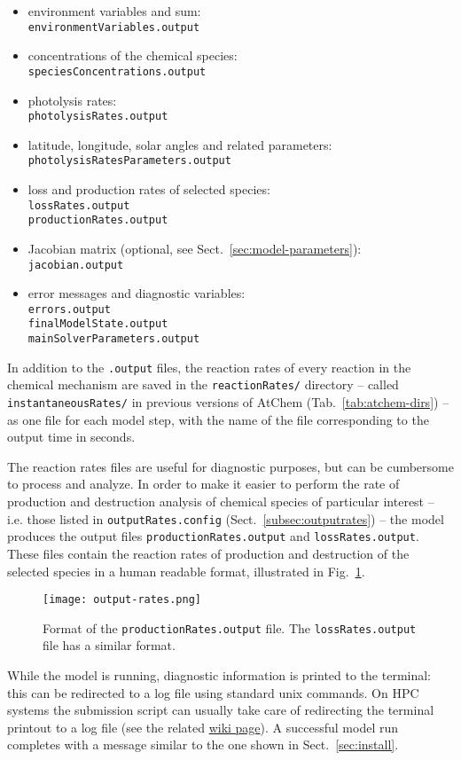 \begin{itemize}
\item environment variables and  sum:\\
  \texttt{environmentVariables.output}
\item concentrations of the chemical species:\\
  \texttt{speciesConcentrations.output}
\item photolysis rates:\\
  \texttt{photolysisRates.output}
\item latitude, longitude, solar angles and related parameters:\\
  \texttt{photolysisRatesParameters.output}
\item loss and production rates of selected species:\\
  \texttt{lossRates.output}\\
  \texttt{productionRates.output}
\item Jacobian matrix (optional, see Sect.~\ref{sec:model-parameters}):\\
  \texttt{jacobian.output}
\item error messages and diagnostic variables:\\
  \texttt{errors.output}\\
  \texttt{finalModelState.output}\\
  \texttt{mainSolverParameters.output}
\end{itemize}

In addition to the \texttt{.output} files, the reaction rates of every
reaction in the chemical mechanism are saved in the
\texttt{reactionRates/} directory -- called
\texttt{instantaneousRates/} in previous versions of AtChem
(Tab.~\ref{tab:atchem-dirs}) -- as one file for each model step, with
the name of the file corresponding to the output time in seconds.

The reaction rates files are useful for diagnostic purposes, but can
be cumbersome to process and analyze. In order to make it easier to
perform the rate of production and destruction analysis of chemical
species of particular interest -- i.e. those listed in
\texttt{outputRates.config} (Sect.~\ref{subsec:outputrates}) -- the
model produces the output files \texttt{productionRates.output} and
\texttt{lossRates.output}. These files contain the reaction rates of
production and destruction of the selected species in a human readable
format, illustrated in Fig.~\ref{fig:ropa}.

\begin{figure}[htb]
  \centering
  \texttt{[image: output-rates.png]}
  \caption{Format of the \texttt{productionRates.output} file. The
    \texttt{lossRates.output} file has a similar format.}
  \label{fig:ropa}
\end{figure}

While the model is running, diagnostic information is printed to the
terminal: this can be redirected to a log file using standard unix
commands. On HPC systems the submission script can usually take care
of redirecting the terminal printout to a log file (see the related
\href{https://github.com/AtChem/AtChem2/wiki/Running-on-HPC}{wiki page}).
A successful model run completes with a message similar to the one
shown in Sect.~\ref{sec:install}.
